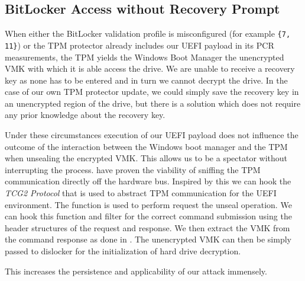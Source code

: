 \subsection{BitLocker Access without Recovery Prompt}
\label{sec:attacks:bitlocker:bitlocker-access-without-recovery-prompt}

When either the BitLocker validation profile is misconfigured (for example \lstinline|{7, 11}|) or the \ac{TPM} protector already includes our \ac{UEFI} payload in its \ac{PCR} measurements, the \ac{TPM} yields the Windows Boot Manager the unencrypted \ac{VMK} with which it is able access the drive.
We are unable to receive a recovery key as none has to be entered and in turn we cannot decrypt the drive.
In the case of our own \ac{TPM} protector update, we could simply save the recovery key in an unencrypted region of the drive, but there is a solution which does not require any prior knowledge about the recovery key.

Under these circumstances execution of our \ac{UEFI} payload does not influence the outcome of the interaction between the Windows boot manager and the \ac{TPM} when unsealing the encrypted \ac{VMK}.
This allows us to be a spectator without interrupting the process.
\cite{tpm-spi-sniffing, tpm-lpc-sniffing} have proven the viability of sniffing the \ac{TPM} communication directly off the hardware bus.
Inspired by this we can hook the \emph{\ac{TCG}2 Protocol} that is used to abstract \ac{TPM} communication for the \ac{UEFI} environment.
The function  is used to perform request the unseal operation.
We can hook this function and filter for the correct command submission using the header structures of the request and response.
We then extract the \ac{VMK} from the command response as done in \cite{tpm-lpc-sniffing}.
The unencrypted \ac{VMK} can then be simply passed to dislocker for the initialization of hard drive decryption.

This increases the persistence and applicability of our attack immensely.

\clearpage
